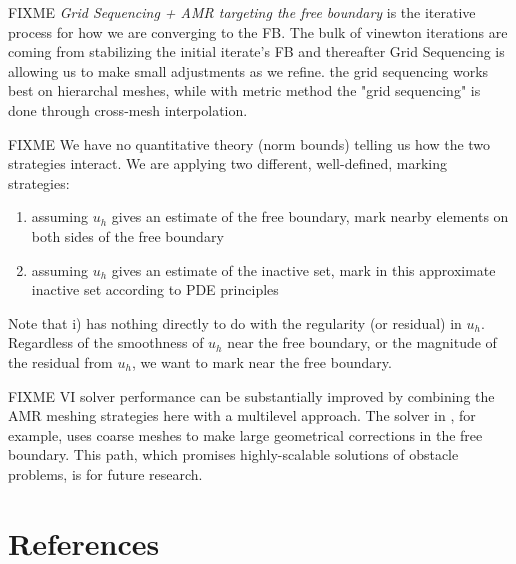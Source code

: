 \documentclass[]{interact}
\theoremstyle{plain}%
\theoremstyle{definition}
\theoremstyle{remark}
\begin{document}
FIXME \emph{Grid Sequencing + AMR targeting the free boundary} is the iterative process for how we are converging to the FB.  The bulk of vinewton iterations are coming from stabilizing the initial iterate's FB and thereafter Grid Sequencing is allowing us to make small adjustments as we refine.  the grid sequencing works best on hierarchal meshes, while with metric method the "grid sequencing" is done through cross-mesh interpolation.

FIXME We have no quantitative theory (norm bounds) telling us how the two strategies interact.  We are applying two different, well-defined, marking strategies:
\begin{enumerate}
\item assuming $u_h$ gives an estimate of the free boundary, mark nearby elements on both sides of the free boundary
\item assuming $u_h$ gives an estimate of the inactive set, mark in this approximate inactive set according to PDE principles
\end{enumerate}
Note that i) has nothing directly to do with the regularity (or residual) in $u_h$.  Regardless of the smoothness of $u_h$ near the free boundary, or the magnitude of the residual from $u_h$, we want to mark near the free boundary.

FIXME VI solver performance can be substantially improved by combining the AMR meshing strategies here with a multilevel approach.  The solver in \cite{BuelerFarrell2024}, for example, uses coarse meshes to make large geometrical corrections in the free boundary.  This path, which promises highly-scalable solutions of obstacle problems, is for future research.




\section{References}





\end{document}
